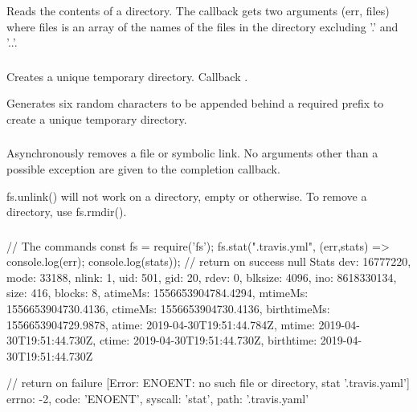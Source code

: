 Reads the contents of a directory. The callback gets two arguments (err,
files) where files is an array of the names of the files in the directory
excluding '.' and '..'.

\subsubsection{}

Creates a unique temporary directory. Callback .

Generates six random characters to be appended behind a required prefix to
create a unique temporary directory.




\subsubsection{}

Asynchronously removes a file or symbolic link. No arguments other than a
possible exception are given to the completion callback.

fs.unlink() will not work on a directory, empty or otherwise. To remove a
directory, use fs.rmdir().




\subsubsection{}

\begin{js}
  // The commands
  const fs = require('fs');
  fs.stat(".travis.yml", (err,stats) => {console.log(err);
                                         console.log(stats)});
  // return on success
  null
  Stats {
    dev: 16777220,
    mode: 33188,
    nlink: 1,
    uid: 501,
    gid: 20,
    rdev: 0,
    blksize: 4096,
    ino: 8618330134,
    size: 416,
    blocks: 8,
    atimeMs: 1556653904784.4294,
    mtimeMs: 1556653904730.4136,
    ctimeMs: 1556653904730.4136,
    birthtimeMs: 1556653904729.9878,
    atime: 2019-04-30T19:51:44.784Z,
    mtime: 2019-04-30T19:51:44.730Z,
    ctime: 2019-04-30T19:51:44.730Z,
    birthtime: 2019-04-30T19:51:44.730Z }

  // return on failure
  { [Error: ENOENT: no such file or directory, stat '.travis.yaml']
    errno: -2,
    code: 'ENOENT',
    syscall: 'stat',
    path: '.travis.yaml' }
\end{js}


